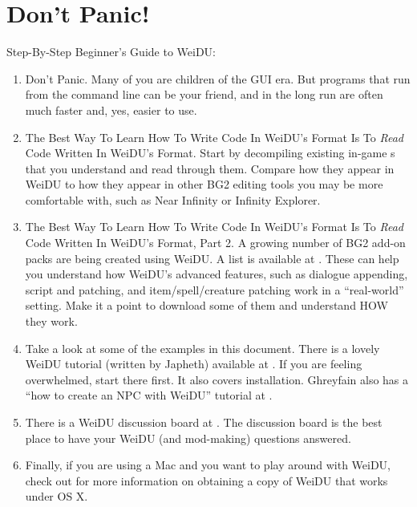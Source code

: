\documentclass{article}
\def\ttref#1{\ahrefloc{#1}{\tt #1}}
\begin{document}
\section{Don't Panic!}

Step-By-Step Beginner's Guide to WeiDU:

\begin{enumerate}

\item Don't Panic. Many of you are children of the GUI era. But programs
that run from the command line can be your friend, and in the long run are
often much faster and, yes, easier to use.

\item The Best Way To Learn How To Write Code In WeiDU's \ttref{D} Format
Is To {\em Read} Code Written In WeiDU's \ttref{D} Format. Start by decompiling
existing in-game \ttref{DLG}s that you understand and read through them.
Compare how they appear in WeiDU to how they appear in other BG2 editing
tools you may be more comfortable with, such as Near Infinity or Infinity
Explorer.

\item The Best Way To Learn How To Write Code In WeiDU's \ttref{D} Format
Is To {\em Read} Code Written In WeiDU's \ttref{D} Format, Part 2. A growing
number of BG2 add-on packs are being created using WeiDU. A list is
available at
.
These
can help you understand how WeiDU's advanced features, such as dialogue
appending, script and \ttref{2DA} patching, and item/spell/creature
patching work in a ``real-world'' setting.  Make it a point to download some
of them and understand HOW they work.

\item Take a look at some of the examples in this document.
There is a lovely WeiDU tutorial (written by
Japheth) available at
.
If you
are feeling overwhelmed, start there first. It also covers installation.
Ghreyfain also has a ``how to create an NPC with WeiDU'' tutorial at
.

\item There is a WeiDU discussion board at
.  The
discussion board is the best place to have your WeiDU (and mod-making)
questions answered.

\item Finally, if you are using a Mac and you want to play around with
WeiDU, check out  for more
information on obtaining a copy of WeiDU that works under OS X.

\end{enumerate}
\end{document}
